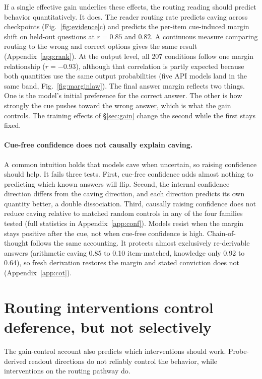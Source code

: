 \documentclass{article}
\begin{document}
If a single effective gain underlies these effects, the routing reading should predict behavior quantitatively. It does. The reader routing rate predicts caving across checkpoints (Fig.~\ref{fig:evidence}c) and predicts the per-item cue-induced margin shift on held-out questions at $r=0.85$ and $0.82$. A continuous measure comparing routing to the wrong and correct options gives the same result (Appendix~\ref{app:rank}). At the output level, all 207 conditions follow one margin relationship ($r=-0.93$), although that correlation is partly expected because both quantities use the same output probabilities (five API models land in the same band, Fig.~\ref{fig:marginlaw}). The final answer margin reflects two things. One is the model's initial preference for the correct answer. The other is how strongly the cue pushes toward the wrong answer, which is what the gain controls. The training effects of \S\ref{sec:gain} change the second while the first stays fixed.

\paragraph{Cue-free confidence does not causally explain caving.} A common intuition holds that models cave when uncertain, so raising confidence should help. It fails three tests. First, cue-free confidence adds almost nothing to predicting which known answers will flip. Second, the internal confidence direction differs from the caving direction, and each direction predicts its own quantity better, a double dissociation. Third, causally raising confidence does not reduce caving relative to matched random controls in any of the four families tested (full statistics in Appendix~\ref{app:conf}). Models resist when the margin stays positive after the cue, not when cue-free confidence is high. Chain-of-thought follows the same accounting. It protects almost exclusively re-derivable answers (arithmetic caving 0.85 to 0.10 item-matched, knowledge only 0.92 to 0.64), so fresh derivation restores the margin and stated conviction does not (Appendix~\ref{app:cot}).

\section{Routing interventions control deference, but not selectively}
\label{sec:dial}

The gain-control account also predicts which interventions should work. Probe-derived readout directions do not reliably control the behavior, while interventions on the routing pathway do.
\end{document}
